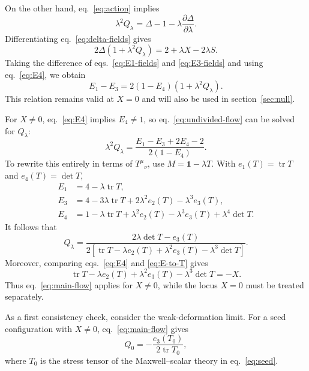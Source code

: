 \documentclass[a4paper,11pt]{article}
\numberwithin{equation}{section}
\newcommand{\tr}{\operatorname{tr}}
\newcommand{\Id}{\mathbf 1}
\begin{document}
On the other hand, eq.~\eqref{eq:action} implies
\begin{equation}
 \lambda^2Q_\lambda
 =\Delta-1-\lambda\frac{\partial\Delta}{\partial\lambda}.
 \label{eq:Q-delta}
\end{equation}
Differentiating eq.~\eqref{eq:delta-fields} gives
\begin{equation}
 2\Delta\left(1+\lambda^2Q_\lambda\right)
 =2+\lambda X-2\lambda S.
 \label{eq:Q-field-relation}
\end{equation}
Taking the difference of eqs.~\eqref{eq:E1-fields} and \eqref{eq:E3-fields} and using eq.~\eqref{eq:E4}, we obtain
\begin{equation}
 E_1-E_3
 =2(1-E_4)\left(1+\lambda^2Q_\lambda\right).
 \label{eq:undivided-flow}
\end{equation}
This relation remains valid at $X=0$ and will also be used in section~\ref{sec:null}.

For $X\neq0$, eq.~\eqref{eq:E4} implies $E_4\neq1$, so eq.~\eqref{eq:undivided-flow} can be solved for $Q_\lambda$:
\begin{equation}
 \lambda^2Q_\lambda
 =\frac{E_1-E_3+2E_4-2}{2(1-E_4)}.
 \label{eq:flow-E}
\end{equation}
To rewrite this entirely in terms of $T^\mu{}_{\nu}$, use $M=\Id-\lambda T$. With $e_1(T)=\tr T$ and $e_4(T)=\det T$,
\begin{align}
 E_1&=4-\lambda\tr T,\nonumber\\
 E_3&=4-3\lambda\tr T+2\lambda^2e_2(T)-\lambda^3e_3(T),\nonumber\\
 E_4&=1-\lambda\tr T+\lambda^2e_2(T)-\lambda^3e_3(T)+\lambda^4\det T.
 \label{eq:E-to-T}
\end{align}
It follows that
\begin{equation}
 Q_\lambda
 =\frac{2\lambda\det T-e_3(T)}
 {2\left[\tr T-\lambda e_2(T)+\lambda^2e_3(T)-\lambda^3\det T\right]}.
 \label{eq:main-flow}
\end{equation}
Moreover, comparing eqs.~\eqref{eq:E4} and \eqref{eq:E-to-T} gives
\begin{equation}
 \tr T-\lambda e_2(T)+\lambda^2e_3(T)-\lambda^3\det T=-X.
 \label{eq:denominator-X}
\end{equation}
Thus eq.~\eqref{eq:main-flow} applies for $X\neq0$, while the locus $X=0$ must be treated separately.

As a first consistency check, consider the weak-deformation limit. For a seed configuration with $X\neq0$, eq.~\eqref{eq:main-flow} gives
\begin{equation}
 Q_0=-\frac{e_3(T_0)}{2\tr T_0},
 \label{eq:leading-flow}
\end{equation}
where $T_0$ is the stress tensor of the Maxwell--scalar theory in eq.~\eqref{eq:seed}.
\end{document}
